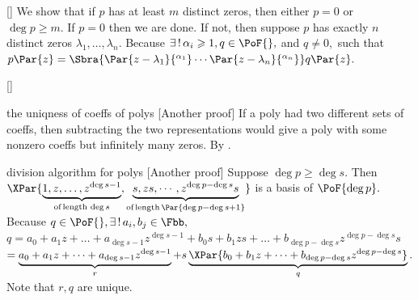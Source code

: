 
\vspace{3pt}

\ProblemBnoor[]{\Tips \,\,\,}[]{
	\Blind{\Tips \,\,\,} 
}\TextB{}
\Or We show that if $p$ has at least $m$ distinct zeros, then either $p=0$ or $\deg p\geqslant m.$\TextB{}
If $p=0$ then we are done. If not, then suppose $p$ has exactly $n$ distinct zeros $\lambda_1,\dots,\lambda_n.$\TextB{}
Because $\exists\,!\,\alpha_i\geqslant 1,q\in\PoF{},$ and $q\neq 0,$ such that $p\Par{z}=\Sbra{\Par{z-\lambda_1}{^{\alpha_1}}\cdots\Par{z-\lambda_n}{^{\alpha_n}}}q\Par{z}.$\PfEnd\vspace{2pt}

\ProblemBnoor[]{\Comment\,\,\,}[]{
}\SepLine

\BulletPointX\NoteFor{[4.7]} {\tgsl the uniqness of coeffs of polys} \hfill[{\tgsc Another proof}]\TextB{\vspace{2pt}}
If a poly had two different sets of coeffs, then
subtracting the two representations\TextB{}
would give a poly with some nonzero coeffs but infinitely many zeros. By \TIPS.\PfEnd\vspace{-3pt}
\SepLine

\BulletPointX\NoteFor{[4.8]} {\tgsl division algorithm for polys} \hfill[{\tgsc Another proof}]\TextB{\vspace{4pt}}
Suppose $\deg p\geqslant \deg s$. Then $\XPar{\underbrace{1, z,\dots, z^{\deg s-1}}_{\text{of\,length}\,\deg s},\underbrace{s,zs,\cdots,z^{\deg p-\deg s}s}_{\text{of\,length}\,\Par{\deg p-\deg s+1}}}$ is a basis of $\PoF{\deg p}.$\TextB{}
Because $q\in\PoF{},\exists\,!\,a_i,b_j\in\Fbb,$\TextB{}
$q=a_0+a_1 z+\dots+a_{\deg s-1}z^{\deg s-1}+ b_0 s+b_1 zs +\dots+ b_{\deg p-\deg s}z^{\deg p-\deg s}s$\TextB{}
$=\underbrace{a_0+a_1 z+\dots+a_{\deg s-1}z^{\deg s-1}}_{r}+s\underbrace{\XPar{b_0+b_1 z +\dots+ b_{\deg p-\deg s}z^{\deg p-\deg s}}}_{q}.$ Note that $r,q$ are unique.\PfEnd[-16pt]
\SepLine

